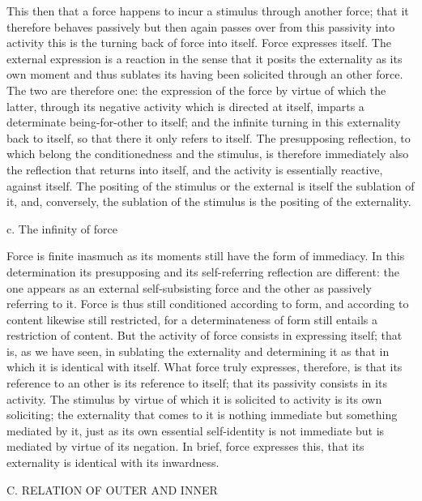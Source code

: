 This then that a force happens to incur a stimulus through another force;
that it therefore behaves passively but then again passes over from
this passivity into activity this is the turning back of force into itself.
Force expresses itself.
The external expression is a reaction in the sense that it
posits the externality as its own moment
and thus sublates its having been solicited through an other force.
The two are therefore one:
the expression of the force by virtue of which the latter,
through its negative activity which is directed at itself,
imparts a determinate being-for-other to itself;
and the infinite turning in this externality back to itself,
so that there it only refers to itself.
The presupposing reflection, to which belong
the conditionedness and the stimulus,
is therefore immediately also the reflection that returns into itself,
and the activity is essentially reactive, against itself.
The positing of the stimulus or the external is itself the sublation of it,
and, conversely, the sublation of the stimulus is the positing of the externality.

c. The infinity of force

Force is finite inasmuch as its moments still have the form of immediacy.
In this determination its presupposing and its self-referring reflection are
different: the one appears as an external self-subsisting force and the other
as passively referring to it. Force is thus still conditioned according to form,
and according to content likewise still restricted, for a determinateness of
form still entails a restriction of content. But the activity of force consists
in expressing itself; that is, as we have seen, in sublating the externality and
determining it as that in which it is identical with itself. What force truly
expresses, therefore, is that its reference to an other is its reference to itself;
that its passivity consists in its activity. The stimulus by virtue of which it
is solicited to activity is its own soliciting; the externality that comes to it is
nothing immediate but something mediated by it, just as its own essential
self-identity is not immediate but is mediated by virtue of its negation. In
brief, force expresses this, that its externality is identical with its inwardness.

C. RELATION OF OUTER AND INNER

